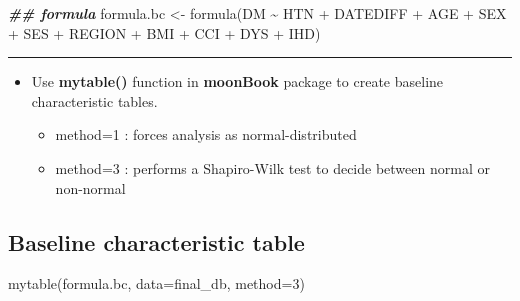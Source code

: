 \documentclass[
]{book}
\newenvironment{Shaded}{\begin{snugshade}}{\end{snugshade}}
\newcommand{\AttributeTok}[1]{\textcolor[rgb]{0.77,0.63,0.00}{#1}}
\newcommand{\DecValTok}[1]{\textcolor[rgb]{0.00,0.00,0.81}{#1}}
\newcommand{\DocumentationTok}[1]{\textcolor[rgb]{0.56,0.35,0.01}{\textbf{\textit{#1}}}}
\newcommand{\FunctionTok}[1]{\textcolor[rgb]{0.00,0.00,0.00}{#1}}
\newcommand{\NormalTok}[1]{#1}
\newcommand{\OtherTok}[1]{\textcolor[rgb]{0.56,0.35,0.01}{#1}}
\newcommand{\SpecialCharTok}[1]{\textcolor[rgb]{0.00,0.00,0.00}{#1}}
\providecommand{\tightlist}{%
  \setlength{\itemsep}{0pt}\setlength{\parskip}{0pt}}
\theoremstyle{definition}
\theoremstyle{definition}
\theoremstyle{definition}
\theoremstyle{definition}
\theoremstyle{remark}
\begin{document}
\begin{Shaded}
\begin{Highlighting}[]
\DocumentationTok{\#\# formula}
\NormalTok{formula.bc }\OtherTok{\textless{}{-}} \FunctionTok{formula}\NormalTok{(DM }\SpecialCharTok{\textasciitilde{}}\NormalTok{ HTN }\SpecialCharTok{+}\NormalTok{ DATEDIFF }\SpecialCharTok{+}\NormalTok{ AGE }\SpecialCharTok{+}\NormalTok{ SEX }\SpecialCharTok{+}\NormalTok{ SES }\SpecialCharTok{+}\NormalTok{ REGION }\SpecialCharTok{+}\NormalTok{ BMI }\SpecialCharTok{+}\NormalTok{ CCI }\SpecialCharTok{+}\NormalTok{ DYS }\SpecialCharTok{+}\NormalTok{ IHD)}
\end{Highlighting}
\end{Shaded}

\begin{center}\rule{0.5\linewidth}{0.5pt}\end{center}

\begin{itemize}
\tightlist
\item
  Use \textbf{mytable()} function in \textbf{moonBook} package to create baseline characteristic tables.

  \begin{itemize}
  \tightlist
  \item
    method=1 : forces analysis as normal-distributed\\
  \item
    method=3 : performs a Shapiro-Wilk test to decide between normal or non-normal
  \end{itemize}
\end{itemize}

\hypertarget{baseline-characteristic-table-1}{%
\subsection{Baseline characteristic table}\label{baseline-characteristic-table-1}}

\begin{Shaded}
\begin{Highlighting}[]
\FunctionTok{mytable}\NormalTok{(formula.bc, }\AttributeTok{data=}\NormalTok{final\_db, }\AttributeTok{method=}\DecValTok{3}\NormalTok{) }
\end{Highlighting}
\end{Shaded}
\end{document}
